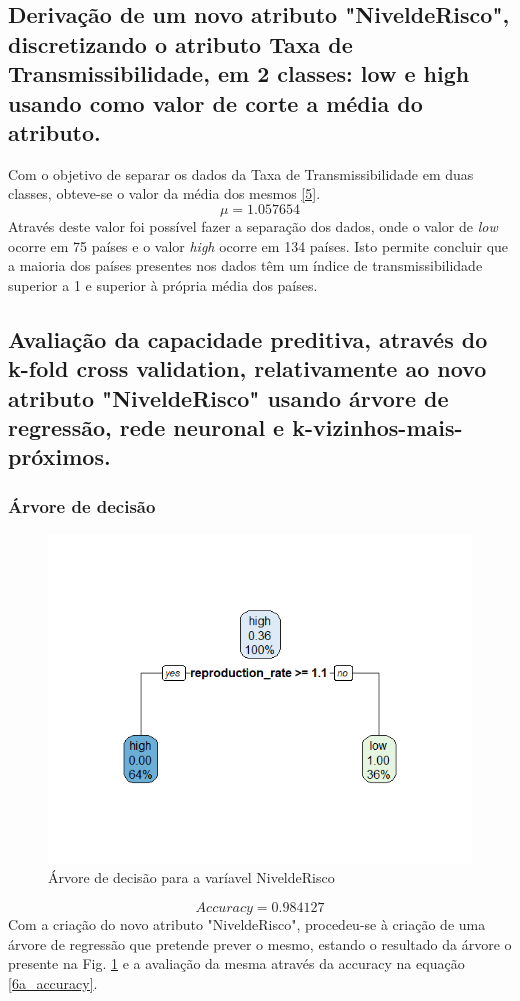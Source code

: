 \documentclass[conference]{IEEEtran}
\begin{document}
\subsection{Derivação de um novo atributo "NiveldeRisco", discretizando o atributo Taxa de Transmissibilidade, em 2 classes: low e high usando como valor de corte a média do atributo.}
\label{ex05}
Com o objetivo de separar os dados da Taxa de Transmissibilidade em duas classes, obteve-se o valor da média dos mesmos \eqref{5}.
\begin{equation}
\mu = 1.057654\label{5}
\end{equation}
Através deste valor foi possível fazer a separação dos dados, onde o valor de \textit{low} ocorre em 75 países e o valor \textit{high} ocorre em 134 países. Isto permite concluir que a maioria dos países presentes nos dados têm um índice de transmissibilidade superior a 1 e superior à própria média dos países.


\subsection{Avaliação da capacidade preditiva, através do k-fold cross validation, relativamente ao novo atributo "NiveldeRisco" usando árvore de regressão, rede neuronal e k-vizinhos-mais-próximos.}
\subsubsection{Árvore de decisão}
\begin{figure}[htbp]
\centerline{\includegraphics[width=0.95\columnwidth]{images/06_1.png}}
\caption{Árvore de decisão para a varíavel NiveldeRisco}
\label{6a_rpart}
\end{figure}
\begin{equation}
Accuracy = 0.984127\label{6a_accuracy}
\end{equation}
Com a criação do novo atributo "NiveldeRisco", procedeu-se à criação de uma árvore de regressão que pretende prever o mesmo, estando o resultado da árvore o presente na Fig. \ref{6a_rpart} e a avaliação da mesma através da accuracy na equação \eqref{6a_accuracy}.
\end{document}
